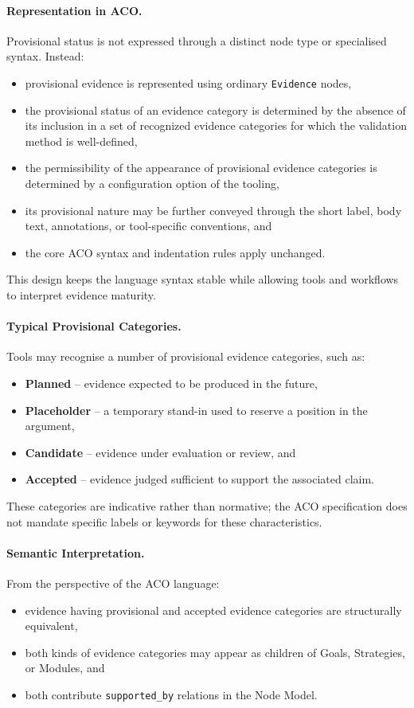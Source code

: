 \documentclass[11pt,twoside,a4paper]{article}
\begin{document}
\paragraph{Representation in ACO.}
Provisional status is not expressed through a distinct node type or specialised
syntax. Instead:
\begin{itemize}[leftmargin=2em]
  \item provisional evidence is represented using ordinary \texttt{Evidence} nodes,
  \item the provisional status of an evidence category is determined by the absence of its inclusion in a set of recognized evidence categories for which the validation method is well-defined,
  \item the permissibility of the appearance of provisional evidence categories is determined by a configuration option of the tooling,
  \item its provisional nature may be further conveyed through the short label, body text,
        annotations, or tool-specific conventions, and
  \item the core ACO syntax and indentation rules apply unchanged.
\end{itemize}

This design keeps the language syntax stable while allowing tools and workflows
to interpret evidence maturity.

\paragraph{Typical Provisional Categories.}
Tools may recognise a number of provisional evidence categories, such as:
\begin{itemize}[leftmargin=2em]
  \item \textbf{Planned} -- evidence expected to be produced in the future,
  \item \textbf{Placeholder} -- a temporary stand-in used to reserve a position in the argument,
  \item \textbf{Candidate} -- evidence under evaluation or review, and
  \item \textbf{Accepted} -- evidence judged sufficient to support the associated claim.
\end{itemize}

These categories are indicative rather than normative; the ACO specification does
not mandate specific labels or keywords for these characteristics.

\paragraph{Semantic Interpretation.}
From the perspective of the ACO language:
\begin{itemize}[leftmargin=2em]
  \item evidence having provisional and accepted evidence categories are structurally equivalent,
  \item both kinds of evidence categories may appear as children of Goals, Strategies, or Modules, and
  \item both contribute \texttt{supported\_by} relations in the Node Model.
\end{itemize}
\end{document}
